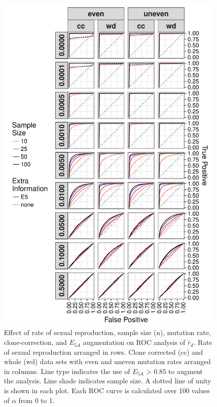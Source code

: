 \documentclass[]{article}
\theoremstyle{definition}
\theoremstyle{definition}
\theoremstyle{definition}
\theoremstyle{remark}
\begin{document}
\begin{figure}
\centering
\includegraphics[height=1.20000\textwidth]{figure/ROC_Curve.pdf}
\caption{Effect of rate of sexual reproduction, sample size (n),
mutation rate, clone-correction, and \(E_{5A}\) augmentation on ROC
analysis of \(\bar{r}_d\). Rate of sexual reproduction arranged in rows.
Clone corrected (cc) and whole (wd) data sets with even and uneven
mutation rates arranged in columns. Line type indicates the use of
\(E_{5A}\) \textgreater{} 0.85 to augment the analysis. Line shade
indicates sample size. A dotted line of unity is shown in each plot.
Each ROC curve is calculated over 100 values of \(\alpha\) from 0 to
1.}\label{fig:simroc}
\end{figure}
\end{document}
